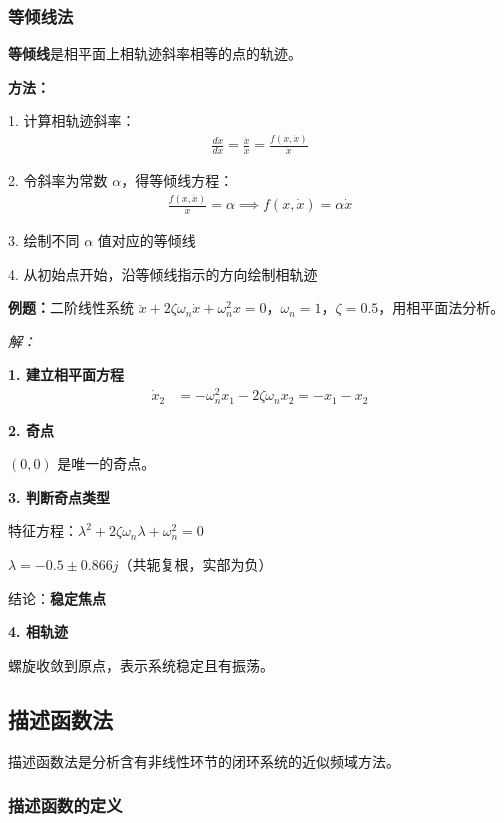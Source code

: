\subsubsection{等倾线法}

\textbf{等倾线}是相平面上相轨迹斜率相等的点的轨迹。

\textbf{方法：}

1. 计算相轨迹斜率：
\begin{align*}
\frac{d\dot{x}}{dx} = \frac{\ddot{x}}{\dot{x}} = \frac{f(x, \dot{x})}{\dot{x}}
\end{align*}

2. 令斜率为常数 $\alpha$，得等倾线方程：
\begin{align*}
\frac{f(x, \dot{x})}{\dot{x}} = \alpha \implies f(x, \dot{x}) = \alpha \dot{x}
\end{align*}

3. 绘制不同 $\alpha$ 值对应的等倾线

4. 从初始点开始，沿等倾线指示的方向绘制相轨迹

\vspace{0.3cm}
\textbf{例题：}二阶线性系统 $\ddot{x} + 2\zeta\omega_n\dot{x} + \omega_n^2 x = 0$，$\omega_n = 1$，$\zeta = 0.5$，用相平面法分析。

\textit{解：}

\textbf{1. 建立相平面方程}
\begin{align*}
\dot{x}_2 &= -\omega_n^2 x_1 - 2\zeta\omega_n x_2 = -x_1 - x_2
\end{align*}

\textbf{2. 奇点}

$(0, 0)$ 是唯一的奇点。

\textbf{3. 判断奇点类型}

特征方程：$\lambda^2 + 2\zeta\omega_n\lambda + \omega_n^2 = 0$

$\lambda = -0.5 \pm 0.866j$（共轭复根，实部为负）

结论：\textbf{稳定焦点}

\textbf{4. 相轨迹}

螺旋收敛到原点，表示系统稳定且有振荡。

\subsection{描述函数法}

描述函数法是分析含有非线性环节的闭环系统的近似频域方法。

\subsubsection{描述函数的定义}

